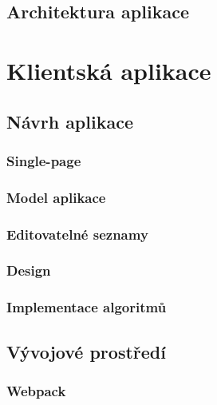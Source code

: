 \documentclass[a4paper,11pt,titlepage,fleqn]{article}
\begin{document}
    \subsection{Architektura aplikace}


\newpage
\section{Klientská aplikace}

    \subsection{Návrh aplikace}

        \subsubsection{Single-page}

        \subsubsection{Model aplikace}

        \subsubsection{Editovatelné seznamy}

        \subsubsection{Design}

        \subsubsection{Implementace algoritmů}

    \subsection{Vývojové prostředí}
        \subsubsection{Webpack}
\end{document}
